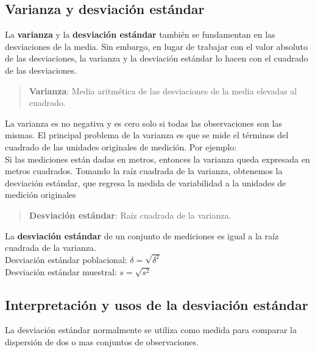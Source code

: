 \documentclass[]{article}
\begin{document}
\subsection*{Varianza y desviación estándar}
La \textbf{varianza} y la \textbf{desviación estándar} también se fundamentan en las desviaciones de la media. Sin embargo, en lugar de trabajar con el valor absoluto de las desviaciones, la varianza y la desviación estándar lo hacen con el cuadrado de las desviaciones.
\begin{quote}
	\item \textbf{Varianza}: Media aritmética de las desviaciones de la media elevadas al cuadrado.
\end{quote}
La varianza es no negativa y es cero solo si todas las observaciones son las mismas.
El principal problema de la varianza es que se mide el términos del cuadrado de las unidades originales de medición. Por ejemplo:\\ Si las mediciones están dadas en metros, entonces la varianza queda expresada en metros cuadrados. Tomando la raíz cuadrada de la varianza, obtenemos la desviación estándar, que regresa la medida de variabilidad a la unidades de medición originales
\begin{quote}
	\item \textbf{Desviación estándar}: Raíz cuadrada de la varianza.
\end{quote}
La \textbf{desviación estándar} de un conjunto de mediciones es igual a la raíz cuadrada de la varianza.\\
Desviación estándar poblacional: $\delta = \sqrt{\delta^{2}}$\\
Desviación estándar muestral: $s = \sqrt{s^{2}}$
\subsection{Interpretación y usos de la desviación estándar}
La desviación estándar normalmente se utiliza como medida para comparar la dispersión de dos o mas conjuntos de observaciones.
\end{document}
